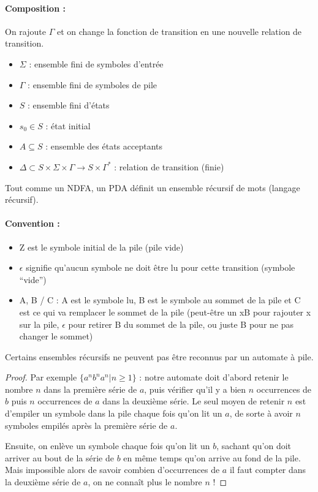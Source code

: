 \paragraph{Composition :}
On rajoute $\Gamma$ et on change la fonction de transition en une nouvelle
relation de transition.
\begin{itemize}
	\item $\Sigma$ : ensemble fini de symboles d'entrée
	\item $\Gamma$ : ensemble fini de symboles de pile
	\item $S$ : ensemble fini d'états
	\item $s_0 \in S$ : état initial
	\item $A \subseteq S$ : ensemble des états acceptants
	\item $\Delta \subset S \times \Sigma \times \Gamma \rightarrow S \times
		\Gamma^*$ : relation de transition (finie)
\end{itemize}

\begin{myprop}
	Tout comme un NDFA, un PDA définit un ensemble récursif de mots (langage
	récursif).
\end{myprop}

\paragraph{Convention :}
\begin{itemize}
	\item Z est le symbole initial de la pile (pile vide)
	\item $\epsilon$ signifie qu’aucun symbole ne doit être lu pour cette
		transition (symbole ``vide'')
	\item A, B / C : A est le symbole lu, B est le symbole au
		sommet de la pile et C est ce qui va remplacer le
		sommet de la pile (peut-être un xB pour
		rajouter x sur la pile, $\epsilon$ pour retirer B du sommet de la pile,
		ou juste B pour ne pas changer le sommet)
\end{itemize}

\begin{myprop}
	Certains ensembles récursifs ne peuvent pas être reconnus par un automate
	à pile.
\end{myprop}

\begin{proof}
	Par exemple $\{a^n b^n a^n | n\geq 1\}$ : notre automate doit d'abord retenir le nombre $n$ dans la première série de $a$, puis vérifier qu'il y a bien $n$ occurrences de $b$ puis $n$ occurrences de $a$ dans la deuxième série. Le seul moyen de retenir $n$ est d'empiler un symbole dans la pile chaque fois qu'on lit un $a$, de sorte à avoir $n$ symboles empilés après la première série de $a$.

	Ensuite, on enlève un symbole chaque fois qu'on lit un $b$, sachant qu'on doit arriver au bout de la série de $b$ en même temps qu'on arrive au fond de la pile. Mais impossible alors de savoir combien d'occurrences de $a$ il faut compter dans la deuxième série de $a$, on ne connaît plus le nombre $n$ !
\end{proof}

